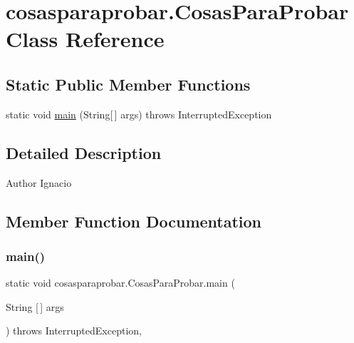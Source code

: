 \hypertarget{classcosasparaprobar_1_1_cosas_para_probar}{}\section{cosasparaprobar.\+Cosas\+Para\+Probar Class Reference}
\label{classcosasparaprobar_1_1_cosas_para_probar}
\subsection*{Static Public Member Functions}
\begin{DoxyCompactItemize}
\item 
static void \mbox{\hyperlink{classcosasparaprobar_1_1_cosas_para_probar_a423e54efe75a56697e235ff194ae3226}{main}} (String\mbox{[}$\,$\mbox{]} args)  throws Interrupted\+Exception 
\end{DoxyCompactItemize}


\subsection{Detailed Description}
\begin{DoxyAuthor}{Author}
Ignacio 
\end{DoxyAuthor}


\subsection{Member Function Documentation}
\mbox{\label{classcosasparaprobar_1_1_cosas_para_probar_a423e54efe75a56697e235ff194ae3226}} 
\subsubsection{\texorpdfstring{main()}{main()}}
{\footnotesize\ttfamily static void cosasparaprobar.\+Cosas\+Para\+Probar.\+main (\begin{DoxyParamCaption}\item[{String \mbox{[}$\,$\mbox{]}}]{args }\end{DoxyParamCaption}) throws Interrupted\+Exception\hspace{0.3cm}{\ttfamily [inline]}, {\ttfamily [static]}}


